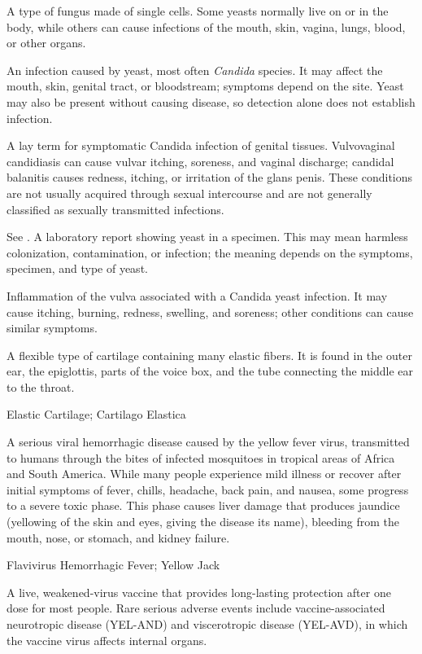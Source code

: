  A type of fungus made of single cells. Some yeasts normally live on or in the body, while others can cause infections of the mouth, skin, vagina, lungs, blood, or other organs.

 An infection caused by yeast, most often \textit{Candida} species. It may affect the mouth, skin, genital tract, or bloodstream; symptoms depend on the site. Yeast may also be present without causing disease, so detection alone does not establish infection.

 A lay term for symptomatic Candida infection of genital tissues. Vulvovaginal candidiasis can cause vulvar itching, soreness, and vaginal discharge; candidal balanitis causes redness, itching, or irritation of the glans penis. These conditions are not usually acquired through sexual intercourse and are not generally classified as sexually transmitted infections.

 See .
 A laboratory report showing yeast in a specimen. This may mean harmless colonization, contamination, or infection; the meaning depends on the symptoms, specimen, and type of yeast.

 Inflammation of the vulva associated with a Candida yeast infection. It may cause itching, burning, redness, swelling, and soreness; other conditions can cause similar symptoms.

 A flexible type of cartilage containing many elastic fibers. It is found in the outer ear, the epiglottis, parts of the voice box, and the tube connecting the middle ear to the throat.

\synonyms
Elastic Cartilage; Cartilago Elastica

 A serious viral hemorrhagic disease caused by the yellow fever virus, transmitted to humans through the bites of infected mosquitoes in tropical areas of Africa and South America. While many people experience mild illness or recover after initial symptoms of fever, chills, headache, back pain, and nausea, some progress to a severe toxic phase. This phase causes liver damage that produces jaundice (yellowing of the skin and eyes, giving the disease its name), bleeding from the mouth, nose, or stomach, and kidney failure.

\synonyms
Flavivirus Hemorrhagic Fever; Yellow Jack

 A live, weakened-virus vaccine that provides long-lasting protection after one dose for most people. Rare serious adverse events include vaccine-associated neurotropic disease (YEL-AND) and viscerotropic disease (YEL-AVD), in which the vaccine virus affects internal organs.

